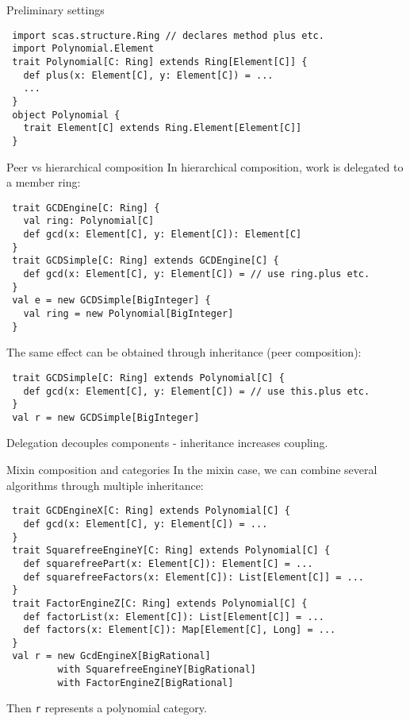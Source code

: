 \documentclass[final]{beamer}
\newcommand{\code}[1]{\texttt{#1}}
\begin{document}
\begin{frame}[fragile]
\begin{columns}[t]
\begin{column}{.3\linewidth}
  \begin{block}{\large Preliminary settings}
\tiny
\begin{lstlisting}
 import scas.structure.Ring // declares method plus etc.
 import Polynomial.Element
 trait Polynomial[C: Ring] extends Ring[Element[C]] {
   def plus(x: Element[C], y: Element[C]) = ...
   ...
 }
 object Polynomial {
   trait Element[C] extends Ring.Element[Element[C]]
 }
\end{lstlisting}
  \end{block}
  \hfill
  \begin{block}{\large Peer vs hierarchical composition}
\tiny
{\footnotesize In hierarchical composition, work is delegated to
a member ring:}
\begin{lstlisting}
 trait GCDEngine[C: Ring] {
   val ring: Polynomial[C]
   def gcd(x: Element[C], y: Element[C]): Element[C]
 }
 trait GCDSimple[C: Ring] extends GCDEngine[C] {
   def gcd(x: Element[C], y: Element[C]) = // use ring.plus etc.
 }
 val e = new GCDSimple[BigInteger] {
   val ring = new Polynomial[BigInteger]
 }
\end{lstlisting}
{\footnotesize The same effect can be obtained through inheritance
(peer composition):}
\begin{lstlisting}
 trait GCDSimple[C: Ring] extends Polynomial[C] {
   def gcd(x: Element[C], y: Element[C]) = // use this.plus etc.
 }
 val r = new GCDSimple[BigInteger]
\end{lstlisting}
{\footnotesize Delegation decouples components - inheritance increases coupling.}
  \end{block}
  \hfill
  \begin{block}{\large Mixin composition and categories}
\tiny
{\footnotesize In the mixin case, we can combine several
algorithms through multiple inheritance:}
\begin{lstlisting}
 trait GCDEngineX[C: Ring] extends Polynomial[C] {
   def gcd(x: Element[C], y: Element[C]) = ...
 }
 trait SquarefreeEngineY[C: Ring] extends Polynomial[C] {
   def squarefreePart(x: Element[C]): Element[C] = ...
   def squarefreeFactors(x: Element[C]): List[Element[C]] = ...
 }
 trait FactorEngineZ[C: Ring] extends Polynomial[C] {
   def factorList(x: Element[C]): List[Element[C]] = ...
   def factors(x: Element[C]): Map[Element[C], Long] = ...
 }
 val r = new GcdEngineX[BigRational] 
         with SquarefreeEngineY[BigRational]
         with FactorEngineZ[BigRational]
\end{lstlisting}
{\footnotesize Then \code{r} represents a polynomial category.
}
\end{block}
\end{column}
\end{columns}
\end{frame}
\end{document}
